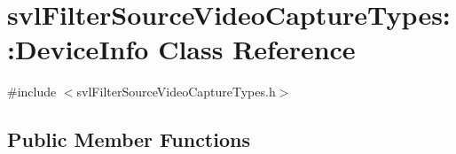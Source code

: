 \hypertarget{classsvl_filter_source_video_capture_types_1_1_device_info}{}\section{svl\+Filter\+Source\+Video\+Capture\+Types\+:\+:Device\+Info Class Reference}
\label{classsvl_filter_source_video_capture_types_1_1_device_info}


{\ttfamily \#include $<$svl\+Filter\+Source\+Video\+Capture\+Types.\+h$>$}

\subsection*{Public Member Functions}

